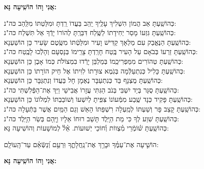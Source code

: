 \documentclass[twoside, openany, parskip=half, 11pt]{book}
\begin{document}
\begin{large}
\textbf{אֲנִי וָהוֹ הוֹשִֽׁיעָה נָּא:}
\end{large}

\begin{small}
כְּהוֹשַֽׁעְתָּ אַב הֲמוֹן הִשְׁלִיךְ עָלֶֽיךָ יַֽהַב בַּעֲדוֹ רַֽדְתָּ וּמִלַּטְתּוֹ מִלַּֽהַב 	\hfill	כּה"נ:\\
כְּהוֹשַֽׁעְתָּ גִּזְעוֹ מָסַר יְחִידָתוֹ לַשֶּֽׁלַח דִּבַּרְֽתָּ לְהוֹרוֹ יָדְֿךָ אַל תִּשְׁלַח 	\hfill	כּה"נ: \\
כְּהוֹשַֽׁעְתָּ הַנֶּאֱבַק עִם מַלְאָךְ קַדִּישׁ וָעִיר וּמִלַּטְֿתּוֹ מִשֶּֽׂטֶם שָׂעִיר 	\hfill	כֵּן הוֹשַׁעְנָא: \\
כְּהוֹשַֽׁעְתָּ זַרְעוֹ בְּבֹאָם עַל הָעִיר בֶּֽטַח חָרַֽדְתָּ צָרֵֽימוֹ בְּנָסְעָם וְהָלְֿכוּ לָבֶֽטַח \hfill	כּה"נ: \\
כְּהוֹשַֽׁעְתָּ טְהוֹרִים מִמַּפְרִיכֵֽמוֹ בְּמַלְבֵּן יָרְֿדוּ בִמְצוֹלֹת כְּמוֹ אָבֶן 			\hfill כֵּן הוֹשַׁעְנָא: \\
כְּהוֹשַֽׁעְתָּ כָּלִיל כְּנִתְעַלְּֿמָה בְּגֹֽמֶא צוּרָתוֹ לִוִּיתוֹ אֶל חֵיק הוֹרָתוֹ 	\hfill	כֵּן הוֹשַׁעְנָא: \\
כְּהוֹשַֽׁעְתָּ מֻצְנָף בַּד כְּנִתְעַבָּר נֶאֶמָן חָל בַּעֲדוֹ וְנִתְגַּבָּר 			\hfill	כֵּן הוֹשַׁעְנָא: \\
כְּהוֹשַֽׁעְתָּ סֻגַּר בְּיַד יִשְׁבִּי בְּנֹב הַגִּתִּי עֲזָרוֹ אֲבִישַׁי וַיַּךְ אֶת־הַפְּֿלִשְׁתִּי 	\hfill	כּה"נ:\\
כְּהוֹשַֽׁעְתָּ פָּקִיד כְּנָד שֶֽׁבַע מִמְּֿעוֹנוֹ צִּפִּֽיתָ לְיִשְׁעוֹ וְשׁוֹבַבְתּוֹ לִמְלוֹנוֹ 	\hfill	כֵּן הוֹשַׁעְנָא:\\
כְּהוֹשַֽׁעְתָּ קָצַב פָּר וְשַׁעְתּוֹ לְמַֽעְלָה רִשְׁפַּתּוֹ הָאֵשׁ וְגַם הַמַּֽיִם אֲשֶׁר בַּתְּֿעָלָה \hfill	כּה"נ:\\
כְּהוֹשַֽׁעְתָּ שִׁוַע לְךָ כִּי מֵת הַיָּֽלֶד תָּשֵׁב רוּחוֹ אֵלָיו וַיָּֽהָם בְּשַׂר הַיָּֽלֶד 	\hfill	כּה"נ:\\
 כְּהוֹשַֽׁעְתָּ שׁ֗וֹמְֿרֵי מִ֗צְווֹת וְ֗חוֹכֵי יְשׁוּעוֹת. אֵ֗ל֗ לְמוֹשָׁעוֹת 		\hfill	וְהוֹשִׁיעָה נָּא:\\

\end{small}

הוֹשִׁ֤יעָה אֶת־עַמֶּ֗ךָ וּבָרֵ֥ךְ אֶת־נַֽחֲלָתֶ֑ךָ וּֽרְעֵ֥ם וְ֝נַשְּֿׂאֵ֗ם עַד־הָֽעוֹלָֽם:


\begin{large}
\textbf{אֲנִי וָהוֹ הוֹשִֽׁיעָה נָּא:}
\end{large}
\end{document}
